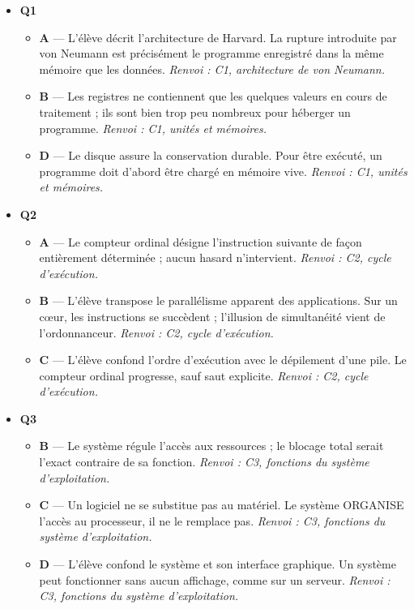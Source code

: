 \begin{itemize}
  \item \textbf{Q1}
  \begin{itemize}
    \item \textbf{A} — L'élève décrit l'architecture de Harvard. La rupture introduite par von Neumann est précisément le programme enregistré dans la même mémoire que les données. \emph{Renvoi : C1, architecture de von Neumann.}
    \item \textbf{B} — Les registres ne contiennent que les quelques valeurs en cours de traitement ; ils sont bien trop peu nombreux pour héberger un programme. \emph{Renvoi : C1, unités et mémoires.}
    \item \textbf{D} — Le disque assure la conservation durable. Pour être exécuté, un programme doit d'abord être chargé en mémoire vive. \emph{Renvoi : C1, unités et mémoires.}
  \end{itemize}
  \item \textbf{Q2}
  \begin{itemize}
    \item \textbf{A} — Le compteur ordinal désigne l'instruction suivante de façon entièrement déterminée ; aucun hasard n'intervient. \emph{Renvoi : C2, cycle d'exécution.}
    \item \textbf{B} — L'élève transpose le parallélisme apparent des applications. Sur un cœur, les instructions se succèdent ; l'illusion de simultanéité vient de l'ordonnanceur. \emph{Renvoi : C2, cycle d'exécution.}
    \item \textbf{C} — L'élève confond l'ordre d'exécution avec le dépilement d'une pile. Le compteur ordinal progresse, sauf saut explicite. \emph{Renvoi : C2, cycle d'exécution.}
  \end{itemize}
  \item \textbf{Q3}
  \begin{itemize}
    \item \textbf{B} — Le système régule l'accès aux ressources ; le blocage total serait l'exact contraire de sa fonction. \emph{Renvoi : C3, fonctions du système d'exploitation.}
    \item \textbf{C} — Un logiciel ne se substitue pas au matériel. Le système ORGANISE l'accès au processeur, il ne le remplace pas. \emph{Renvoi : C3, fonctions du système d'exploitation.}
    \item \textbf{D} — L'élève confond le système et son interface graphique. Un système peut fonctionner sans aucun affichage, comme sur un serveur. \emph{Renvoi : C3, fonctions du système d'exploitation.}

\end{itemize}
\end{itemize}
